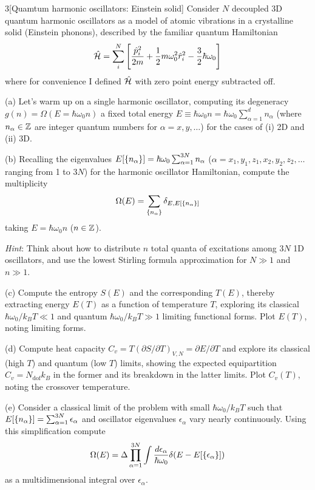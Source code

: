 \documentclass[12pt]{article}
\begin{document}
\begin{problem}{3}[Quamtum harmonic oscillators: Einstein solid]
Consider $N$ decoupled 3D quantum harmonic oscillators as a model of atomic
vibrations in a crystalline solid (Einstein phonons), described by the familiar
quantum Hamiltonian
\begin{equation}
    \hat{\mathcal{H}}=\sum_{i}^N\qty[\frac{\hat{p}_i^2}{2m}+\frac12m\omega_0^2\hat{r}_i^2-\frac32\hbar\omega_0] 
\end{equation}
where for convenience I defined $\hat{\mathcal{H}}$ with zero point energy subtracted off.

(a) Let's warm up on a single harmonic oscillator, computing its degeneracy
$g(n)=\Omega(E=\hbar\omega_0n)$ a fixed total energy
$E\equiv\hbar\omega_0n=\hbar\omega_0\sum_{\alpha=1}^dn_\alpha$ (where
$n_\alpha\in\mathbb{Z}$ are integer quantum numbers for $\alpha=x,y,\hdots$) for the
cases of (i) 2D and (ii) 3D.

(b) Recalling the eigenvalues
$E[\qty{n_\alpha}]=\hbar\omega_0\sum_{\alpha=1}^{3N}n_\alpha$
($\alpha=x_1,y_1,z_1,x_2,y_2,z_2,\hdots$ ranging from 1 to $3N$) for the
harmonic oscillator Hamiltonian, compute the multiplicity
\begin{equation}
    \Omega(E)=\sum_{\qty{n_\alpha}}\delta_{E,E[\qty{n_\alpha}]} 
\end{equation}
taking $E=\hbar\omega_0n$ ($n\in\mathbb{Z}$).

\textit{Hint}: Think about how to distribute $n$ total quanta of excitations
among $3N$ 1D oscillators, and use the lowest Stirling formula approximation for
$N\gg 1$ and $n\gg 1$.

(c) Compute the entropy $S(E)$ and the corresponding $T(E)$, thereby extracting
energy $E(T)$ as a function of temperature $T$, exploring its classical
$\hbar\omega_0/k_BT\ll1$ and quantum $\hbar\omega_0/k_BT\gg1$ limiting
functional forms. Plot $E(T)$, noting limiting forms.

(d) Compute heat capacity
$C_v=T(\partial S/\partial T)_{V,N}=\partial E/\partial T$ and explore its 
classical (high $T$) and quantum (low $T$) limits, showing
the expected equipartition $C_v=N_\text{dof}k_B$ in the former and its 
breakdown in the latter limits. Plot $C_v(T)$, noting the crossover temperature.

(e) Consider a classical limit of the problem with small $\hbar\omega_0/k_BT$
such that $E[\qty{n_\alpha}]=\sum_{\alpha=1}^{3N}\epsilon_\alpha$ and oscillator
eigenvalues $\epsilon_\alpha$ vary nearly continuously. Using this
simplification compute
\begin{equation}
    \Omega(E)=\Delta\prod_{\alpha=1}^{3N}\int\frac{d\epsilon_\alpha}{\hbar\omega_0}
    \delta(E-E[\qty{\epsilon_\alpha}]) 
\end{equation}
as a multidimensional integral over $\epsilon_\alpha$.


\end{problem}
\end{document}
